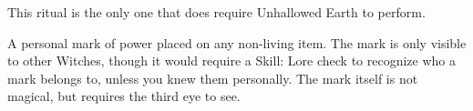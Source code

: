 {This ritual is the only one that does  require Unhallowed Earth to perform.


\OCCULT[
  Name=Witch Mark,
  Link=occultism-witch-mark,
  Success=1,
  Cost=66,
  Widdershins=0
]

A personal mark of power placed on any non-living item.  The mark is only visible to other Witches, though it would require a Skill: Lore check to recognize who a mark belongs to, unless you knew them personally.  The mark itself is not magical, but requires the third eye to see.



} %